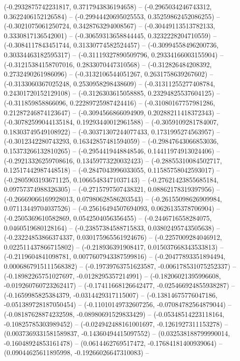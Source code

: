 \begin{scope}[blend group = overlay]
(-0.2932875742231817, 0.3717943836194658) -- 
(-0.2965034246743312, 0.3622406152126584) -- 
(-0.29944420695025553, 0.35259862452086255) -- 
(-0.3021075061250724, 0.3428763294008567) -- 
(-0.30449113513782133, 0.3330817136542001) -- 
(-0.30659313658844445, 0.3232228204710559) -- 
(-0.3084117843451744, 0.31330774582524457) -- 
(-0.30994558496200736, 0.30334463182595317) -- 
(-0.31119327890509796, 0.29334166003155904) -- 
(-0.31215384158707016, 0.2833070447310568) -- 
(-0.312826484208392, 0.2732490261986096) -- 
(-0.3132106544051267, 0.2631758639267602) -- 
(-0.3133060367025248, 0.2530958298438609) -- 
(-0.31311255277408784, 0.24301720152129108) -- 
(-0.3126303615058885, 0.23294825537604125) -- 
(-0.311859858866096, 0.22289725987424416) -- 
(-0.31080167757981286, 0.21287246874123647) -- 
(-0.3094566866094909, 0.20288211418372343) -- 
(-0.30782599044135184, 0.19293440012961588) -- 
(-0.3059109281784007, 0.18303749549108922) -- 
(-0.30371307244077433, 0.1731995274563957) -- 
(-0.3012342280743293, 0.16342857481594059) -- 
(-0.29847643066853036, 0.15373266132810265) -- 
(-0.2954419448848546, 0.14411974913024406) -- 
(-0.29213326259708616, 0.13459773220032423) -- 
(-0.28855310084502717, 0.12517442987448518) -- 
(-0.2847043996033055, 0.11585758042593017) -- 
(-0.2805903193671125, 0.10665483471037143) -- 
(-0.27621423855685184, 0.09757374988326305) -- 
(-0.2715797507438321, 0.08862178319397956) -- 
(-0.26669066169928013, 0.07980628586203543) -- 
(-0.26155098626909984, 0.07113449704037526) -- 
(-0.25616494507694093, 0.0626135378706904) -- 
(-0.2505369610582869, 0.0542504056356455) -- 
(-0.2446716558284075, 0.0460519680128164) -- 
(-0.23857384588715833, 0.03802495743505638) -- 
(-0.23224853866374337, 0.030175965561924676) -- 
(-0.2257009284046912, 0.022511437866715802) -- 
(-0.218936391908417, 0.015037668343533813) -- 
(-0.2119604841098781, 0.0077607943387599816) -- 
(-0.20477893351894494, 0.0006867915111568382) -- 
(-0.19739763751623587, -0.006178531075252337) -- 
(-0.18982265751027697, -0.0128295357214991) -- 
(-0.18206021395996608, -0.019260760723262417) -- 
(-0.17411668126642477, -0.025466924855938287) -- 
(-0.1659985825384379, -0.0314429317115007) -- 
(-0.13814675776047186, -0.051389728187050454) -- 
(-0.11010149732607256, -0.07084782564879044) -- 
(-0.08187628874232598, -0.08980691529833429) -- 
(-0.05348514223118164, -0.10825785303989452) -- 
(-0.024942488161001697, -0.1261927311153278) -- 
(0.0037369331581589837, -0.14360494415097552) -- 
(0.032538188799990014, -0.16048924853161478) -- 
(0.0614462769517472, -0.17684181400939064) -- 
(0.09044625611895998, -0.19266026647310083) -- 

\end{scope}
